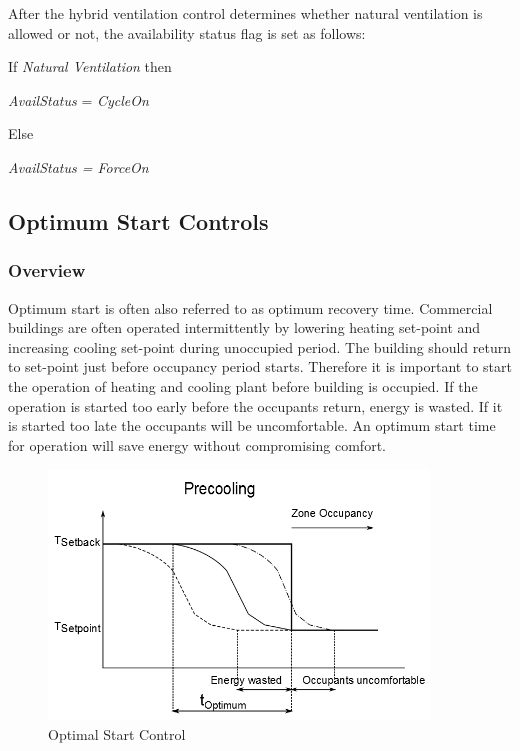 After the hybrid ventilation control determines whether natural ventilation is allowed or not, the availability status flag is set as follows:

If \emph{Natural Ventilation} then

\emph{AvailStatus} = \emph{CycleOn}

Else

\emph{AvailStatus = ForceOn}

\subsection{\textbf{Optimum Start Controls}}\label{optimum-start-controls}

\subsubsection{Overview}\label{overview-1-008}

Optimum start is often also referred to as optimum recovery time. Commercial buildings are often operated intermittently by lowering heating set-point and increasing cooling set-point during unoccupied period. The building should return to set-point just before occupancy period starts. Therefore it is important to start the operation of heating and cooling plant before building is occupied. If the operation is started too early before the occupants return, energy is wasted. If it is started too late the occupants will be uncomfortable. An optimum start time for operation will save energy without compromising comfort.

\begin{figure}[hbtp] %
\centering
\includegraphics[width=0.9\textwidth, height=0.9\textheight, keepaspectratio=true]{media/image6731.png}
\caption{Optimal Start Control \protect \label{fig:optimal-start-control}}
\end{figure}

